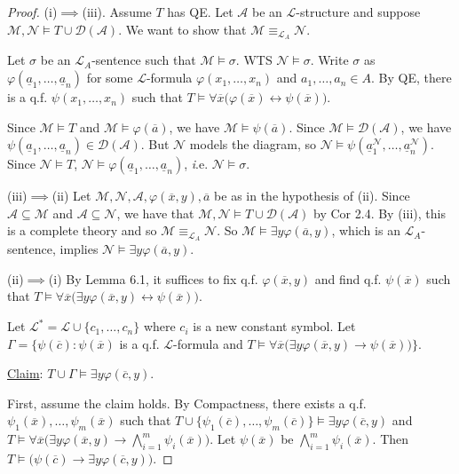 \documentclass[]{article}
\theoremstyle{custhm}
\theoremstyle{cusdef}
\theoremstyle{custhm}
\theoremstyle{custhm}
\theoremstyle{custhm}
\theoremstyle{ex}
\theoremstyle{custhm}
\theoremstyle{cusdef}
\theoremstyle{remark}
\theoremstyle{remark}
\theoremstyle{numremark}
\renewcommand{\L}{\mathcal{L}}
\renewcommand{\it}[1]{\textit{#1}}
\newcommand{\M}{\mathcal{M}}
\renewcommand{\phi}{\varphi}
\renewcommand{\bar}{\overline}
\newcommand{\N}{\mathcal{N}}
\newcommand{\A}{\mathcal{A}}
\newcommand{\D}{\mathcal{D}}
\renewcommand{\subset}{\subseteq}
\begin{document}
\begin{proof}
(i)$\implies$(iii). Assume $T$ has QE. Let $\A$ be an $\L$-structure and suppose $\M,\N\models T\cup \D(\A)$. We want to show that $\M \equiv_{\L_A} \N$.

Let $\sigma$ be an $\L_A$-sentence such that $\M\models \sigma$. WTS $\N\models \sigma$. Write $\sigma$ as $\phi(\underline{a}_1,\dots,\underline{a}_n)$ for some $\L$-formula $\phi(x_1,\dots,x_n)$ and $a_1,\dots,a_n\in A$. By QE, there is a q.f. $\psi(x_1,\dots,x_n)$ such that $T\models \forall \bar{x}\big(\phi(\bar{x})\leftrightarrow \psi(\bar{x})\big)$.

Since $\M\models T$ and $\M\models \phi(\bar{a})$, we have $\M\models \psi(\bar{a})$. Since $\M\models\D(\A)$, we have $\psi(\underline{a}_1,\dots,\underline{a}_n)\in\D(\A)$. But $\N$ models the diagram, so $\N\models\psi(\underline{a}_1^\N,\dots,\underline{a}_n^\N)$. Since $\N\models T$, $\N\models \phi(\underline{a}_1,\dots,\underline{a}_n)$, {\it i.e.} $\N\models \sigma$.

(iii)$\implies$(ii) Let $\M,\N,\A,\phi(\bar{x},y),\bar{a}$ be as in the hypothesis of (ii). Since $\A\subset \M$ and $\A\subset \N$, we have that $\M,\N\models T\cup \D(\A)$ by Cor 2.4. By (iii), this is a complete theory and so $\M\equiv_{\L_A}\N$. So $\M\models \exists y\phi(\bar{a},y)$, which is an $\L_A$-sentence, implies $\N\models \exists y \phi(\bar{a},y)$.

(ii)$\implies$(i) By Lemma 6.1, it suffices to fix q.f. $\phi(\bar{x},y)$ and find q.f. $\psi(\bar{x})$ such that $T\models \forall \bar{x}\big(\exists y \phi(\bar{x},y)\leftrightarrow\psi(\bar{x})\big)$.

Let $\L^\ast = \L \cup \{c_1,\dots,c_n\}$ where $c_i$ is a new constant symbol. Let $\Gamma = \{\psi(\bar{c}): \psi(\bar{x})$ is a q.f. $\L$-formula and $T\models \forall\bar{x} \big(\exists y\phi(\bar{x},y)\rightarrow \psi(\bar{x})\big)\}$.

\underline{Claim}: $T\cup \Gamma \models \exists y\phi(\bar{c},y)$.

First, assume the claim holds. By Compactness, there exists a q.f. $\psi_1(\bar{x}),\dots,\psi_m(\bar{x})$ such that $T\cup\{\psi_1(\bar{c}),\dots,\psi_m(\bar{c})\}\models \exists y\phi(\bar{c},y)$ and $T\models \forall \bar{x}\big(\exists y\phi(\bar{x},y)\rightarrow \bigwedge_{i=1}^{m}\psi_i(\bar{x})\big)$. Let $\psi(\bar{x})$ be $\bigwedge_{i=1}^{m}\psi_i(\bar{x})$. Then $T\models \big(\psi(\bar{c}) \rightarrow \exists y\phi(\bar{c},y)\big)$.


\end{proof}
\end{document}
